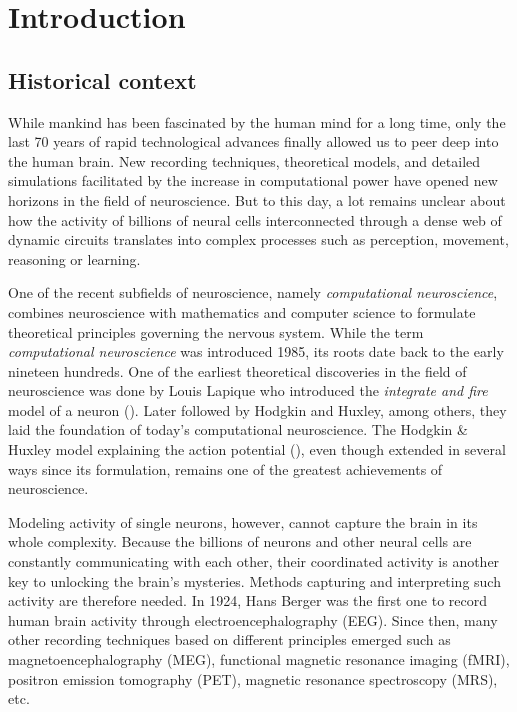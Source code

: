 
\chapter{Introduction}
\label{chap:intr}

\section*{Historical context}
While mankind has been fascinated by the human mind for a long time, only the last 70 years of rapid technological advances finally allowed us to peer deep into the human brain.
New recording techniques, theoretical models, and detailed simulations facilitated by the increase in computational power have opened new horizons in the field of neuroscience.
But to this day, a lot remains unclear about how the activity of billions of neural cells interconnected through a dense web of dynamic circuits translates into complex processes such as perception, movement, reasoning or learning.  

One of the recent subfields of neuroscience, namely \textit{computational neuroscience}, combines neuroscience with mathematics and computer science to formulate theoretical principles governing the nervous system. 
While the term \textit{computational neuroscience} was introduced 1985, its roots date back to the early nineteen hundreds. 
One of the earliest theoretical discoveries in the field of neuroscience was done by Louis Lapique who introduced the \textit{integrate and fire} model of a neuron (\cite{lapique-1907}).
Later followed by Hodgkin and Huxley, among others, they laid the foundation of today's computational neuroscience.
The Hodgkin \& Huxley model explaining the action potential (\cite{hodgkin1952quantitative}), even though extended in several ways since its formulation, remains one of the greatest achievements of neuroscience. 

Modeling activity of single neurons, however, cannot capture the brain in its whole complexity.
Because the billions of neurons and other neural cells are constantly communicating with each other, their coordinated activity is another key to unlocking the brain’s mysteries.
Methods capturing and interpreting such activity are therefore needed.
In 1924, Hans Berger was the first one to record human brain activity through electroencephalography (EEG).
Since then, many other recording techniques based on different principles emerged such as magnetoencephalography (MEG), functional magnetic resonance imaging (fMRI), positron emission tomography (PET), magnetic resonance spectroscopy (MRS), etc.  

